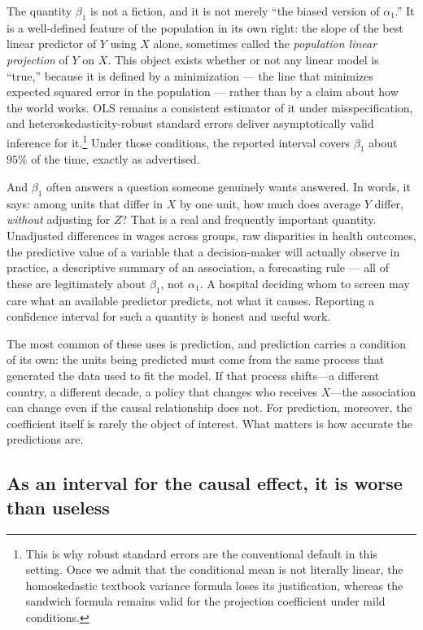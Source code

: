 \documentclass[11pt]{report}
\begin{document}
The quantity \(\beta_1\) is not a fiction, and it is not merely ``the biased version of \(\alpha_1\).'' It is a well-defined feature of the population in its own right: the slope of the best linear predictor of \(Y\) using \(X\) alone, sometimes called the \emph{population linear projection} of \(Y\) on \(X\). This object exists whether or not any linear model is ``true,'' because it is defined by a minimization --- the line that minimizes expected squared error in the population --- rather than by a claim about how the world works. OLS remains a consistent estimator of it under misspecification, and heteroskedasticity-robust standard errors deliver asymptotically valid inference for it.\footnote{This is why robust standard errors are the conventional default in this setting. Once we admit that the conditional mean is not literally linear, the homoskedastic textbook variance formula loses its justification, whereas the sandwich formula remains valid for the projection coefficient under mild conditions.} Under those conditions, the reported interval covers \(\beta_1\) about \(95\%\) of the time, exactly as advertised.

And \(\beta_1\) often answers a question someone genuinely wants answered. In words, it says: among units that differ in \(X\) by one unit, how much does average \(Y\) differ, \emph{without} adjusting for \(Z\)? That is a real and frequently important quantity. Unadjusted differences in wages across groups, raw disparities in health outcomes, the predictive value of a variable that a decision-maker will actually observe in practice, a descriptive summary of an association, a forecasting rule --- all of these are legitimately about \(\beta_1\), not \(\alpha_1\). A hospital deciding whom to screen may care what an available predictor predicts, not what it causes. Reporting a confidence interval for such a quantity is honest and useful work.

The most common of these uses is prediction, and prediction carries a condition of its own: the units being predicted must come from the same process that generated the data used to fit the model. If that process shifts---a different country, a different decade, a policy that changes who receives \(X\)---the association can change even if the causal relationship does not. For prediction, moreover, the coefficient itself is rarely the object of interest. What matters is how accurate the predictions are.

\subsection{As an interval for the causal effect, it is worse than useless}
\end{document}
